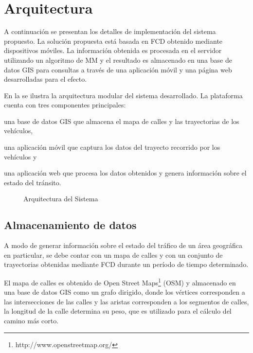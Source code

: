 \section{Arquitectura}
\label{sec:arquitectura}

A continuación se presentan los detalles de implementación del sistema propuesto. La solución propuesta está basada en FCD obtenido mediante dispositivos móviles. La información obtenida es procesada en el servidor utilizando un algoritmo de MM y el resultado es almacenado en una base de datos GIS para consultas a través de una aplicación móvil y una página web desarrolladas para el efecto.

En la  se ilustra la arquitectura modular del sistema desarrollado. La plataforma cuenta con tres componentes principales:
\begin{enumerate*}[1)] \item una base de datos GIS que almacena el mapa de calles y las trayectorias de los vehículos, \item una aplicación móvil que captura los datos del trayecto recorrido por los vehículos y \item una aplicación web que procesa los datos obtenidos y genera información sobre el estado del tránsito.  
\end{enumerate*}

\begin{figure}[h*]
	\centering
	
	\caption{\label{fig:arquitectura} Arquitectura del Sistema}	
\end{figure}

\subsection{Almacenamiento de datos}
\label{base-de-datos}

A modo de generar información sobre el estado del tráfico de un área geográfica en particular, se debe contar con un mapa de calles y con un conjunto de trayectorias obtenidas mediante FCD durante un período de tiempo determinado.

El mapa de calles es obtenido de Open Street Maps\footnote{http://www.openstreetmap.org/} (OSM) y almacenado en una base de datos GIS como un grafo dirigido, donde los vértices corresponden a las intersecciones de las calles y las aristas corresponden a los segmentos de calles, la longitud de la calle determina su peso, que es utilizado para el cálculo del camino más corto.

